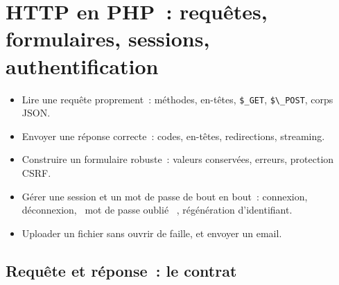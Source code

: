 \documentclass[12pt,a4paper,twoside,openright]{book}
\begin{document}
\chapter{HTTP en PHP~: requ\^etes, formulaires, sessions, authentification}
\label{ch-php-http}

\begin{objectif}
\begin{itemize}
  \item Lire une requ\^ete proprement~: m\'ethodes, en-t\^etes, \verb|$_GET|, \verb|$\_POST|, corps JSON.
  \item Envoyer une r\'eponse correcte~: codes, en-t\^etes, redirections, streaming.
  \item Construire un formulaire robuste~: valeurs conserv\'ees, erreurs, protection CSRF.
  \item G\'erer une session et un mot de passe de bout en bout~: connexion, d\'econnexion,
        \og ~mot de passe oubli\'e~ \fg{}, r\'eg\'en\'eration d'identifiant.
  \item Uploader un fichier sans ouvrir de faille, et envoyer un email.
\end{itemize}
\end{objectif}

\section{Requ\^ete et r\'eponse~: le contrat}
\end{document}
